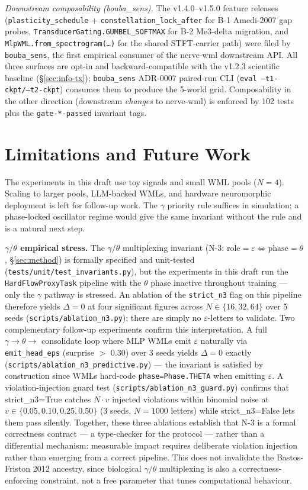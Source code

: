 \documentclass[10pt,twocolumn]{article}
\begin{document}
\textit{Downstream composability (bouba\_sens).}
The v1.4.0--v1.5.0 feature releases (\texttt{plasticity\_schedule} +
\texttt{constellation\_lock\_after} for B-1 Amedi-2007 gap probes,
\texttt{TransducerGating.GUMBEL\_SOFTMAX} for B-2 Me3-delta migration,
and \texttt{MlpWML.from\_spectrogram(\ldots)} for the shared STFT-carrier
path) were filed by \texttt{bouba\_sens}, the first empirical consumer
of the nerve-wml downstream API. All three surfaces are opt-in and
backward-compatible with the v1.2.3 scientific baseline
(\S\ref{sec:info-tx}); \texttt{bouba\_sens} ADR-0007 paired-run CLI
(\texttt{eval --t1-ckpt/--t2-ckpt}) consumes them to produce the
5-world grid. Composability in the other direction (downstream
\emph{changes} to nerve-wml) is enforced by 102 tests plus the
\texttt{gate-*-passed} invariant tags.

\section{Limitations and Future Work}
The experiments in this draft use toy signals and small WML pools
($N=4$). Scaling to larger pools, LLM-backed WMLs, and hardware
neuromorphic deployment is left for follow-up work. The $\gamma$
priority rule suffices in simulation; a phase-locked oscillator
regime would give the same invariant without the rule and is a
natural next step.

\textbf{$\gamma/\theta$ empirical stress.} The $\gamma/\theta$ multiplexing
invariant (N-3: $\text{role}{=}\varepsilon \Leftrightarrow \text{phase}{=}\theta$,
\S\ref{sec:method}) is formally specified and unit-tested
(\texttt{tests/unit/test\_invariants.py}), but the experiments in this draft
run the \texttt{HardFlowProxyTask} pipeline with the $\theta$ phase inactive
throughout training --- only the $\gamma$ pathway is stressed. An ablation
of the \texttt{strict\_n3} flag on this pipeline therefore yields
$\Delta = 0$ at four significant figures across $N \in \{16, 32, 64\}$
over 5 seeds (\texttt{scripts/ablation\_n3.py}): there are simply no
$\varepsilon$-letters to validate. Two complementary follow-up experiments confirm this interpretation.
A full $\gamma \to \theta \to$ consolidate loop where MLP WMLs emit
$\varepsilon$ naturally via \texttt{emit\_head\_eps} (surprise $>$ 0.30)
over 3 seeds yields $\Delta = 0$ exactly
(\texttt{scripts/ablation\_n3\_predictive.py}) --- the invariant is
satisfied by construction since WMLs hard-code \texttt{phase=Phase.THETA}
when emitting $\varepsilon$. A violation-injection guard test
(\texttt{scripts/ablation\_n3\_guard.py}) confirms that strict\_n3=True
catches $N \cdot v$ injected violations within binomial noise at
$v \in \{0.05, 0.10, 0.25, 0.50\}$ (3 seeds, $N{=}1000$ letters)
while strict\_n3=False lets them pass silently. Together, these three
ablations establish that N-3 is a formal correctness contract --- a
type-checker for the protocol --- rather than a differential mechanism:
measurable impact requires deliberate violation injection rather than
emerging from a correct pipeline. This does not invalidate the
Bastos-Friston 2012 ancestry, since biological $\gamma / \theta$
multiplexing is also a correctness-enforcing constraint, not a free
parameter that tunes computational behaviour.
\end{document}
